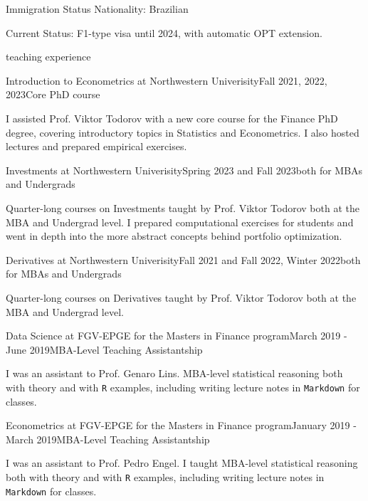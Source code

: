 \documentclass{resume} %
\begin{document}
\begin{rSection}{Immigration Status}
	Nationality: Brazilian
	
	Current Status: F1-type visa until 2024, with automatic OPT extension.
\end{rSection}

\begin{rSection}{teaching experience} \itemsep -20pt

\begin{rSubsection}{Introduction to Econometrics at Northwestern Univerisity}{Fall 2021, 2022, 2023}{Core PhD course}{}
\item I assisted Prof. Viktor Todorov with a new core course for the Finance PhD degree, covering introductory topics in Statistics and Econometrics. I also hosted lectures and prepared empirical exercises.
\end{rSubsection}

\begin{rSubsection}{Investments at Northwestern Univerisity}{Spring 2023 and Fall 2023}{both for MBAs and Undergrads}{}
\item Quarter-long courses on Investments taught by Prof. Viktor Todorov both at the MBA and Undergrad level. I prepared computational exercises for students and went in depth into the more abstract concepts behind portfolio optimization.
\end{rSubsection}

\begin{rSubsection}{Derivatives at Northwestern Univerisity}{Fall 2021 and Fall 2022, Winter 2022}{both for MBAs and Undergrads}{}
\item Quarter-long courses on Derivatives taught by Prof. Viktor Todorov both at the MBA and Undergrad level.
\end{rSubsection}

\begin{rSubsection}{Data Science at FGV-EPGE for the Masters in Finance program}{March 2019 - June 2019}{MBA-Level Teaching Assistantship}{}
\item I was an assistant to Prof. Genaro Lins. MBA-level statistical reasoning both with theory and with \texttt{R} examples, including writing lecture notes in \texttt{Markdown} for classes. 
\end{rSubsection}

\begin{rSubsection}{Econometrics at FGV-EPGE for the Masters in Finance program}{January 2019 - March 2019}{MBA-Level Teaching Assistantship}{}
\item I was an assistant to Prof. Pedro Engel. I taught MBA-level statistical reasoning both with theory and with \texttt{R} examples, including writing lecture notes in \texttt{Markdown} for classes. 
\end{rSubsection}


\end{rSection}
\end{document}
